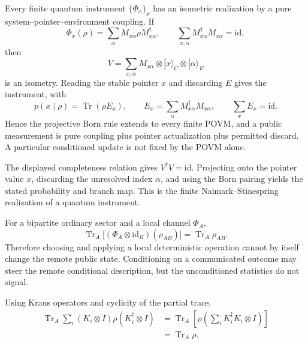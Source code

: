 \begin{theorem}
\label{thm:instrument-dilation}
Every finite quantum instrument \(\{\Phi_x\}_x\) has an isometric realization by a
pure system--pointer--environment coupling.  If
\[
 \Phi_x(\rho)=\sum_\alpha M_{x\alpha}\rho M_{x\alpha}^\dagger,
 \qquad
 \sum_{x,\alpha}M_{x\alpha}^\dagger M_{x\alpha}=\mathrm{id},
\]
then
\[
 V
 =
 \sum_{x,\alpha}
 M_{x\alpha}\otimes|x\rangle_C\otimes|\alpha\rangle_E
\]
is an isometry.  Reading the stable pointer \(x\) and discarding \(E\) gives the
instrument, with
\[
 p(x\mid\rho)
 =\operatorname{Tr}(\rho E_x),
 \qquad
 E_x=\sum_\alpha M_{x\alpha}^\dagger M_{x\alpha},
 \qquad
 \sum_xE_x=\mathrm{id}.
\]
Hence the projective Born rule extends to every finite POVM, and a public
measurement is pure coupling plus pointer actualization plus permitted discard.  A
particular conditioned update is not fixed by the POVM alone.
\end{theorem}

\begin{proofsketch}
The displayed completeness relation gives \(V^\dagger V=\mathrm{id}\).  Projecting
onto the pointer value \(x\), discarding the unresolved index \(\alpha\), and using
the Born pairing yields the stated probability and branch map.  This is the finite
Naimark--Stinespring realization of a quantum instrument.
\end{proofsketch}

\begin{theorem}
\label{thm:no-local-signalling}
For a bipartite ordinary sector and a local channel \(\Phi_A\),
\[
 \boxed{
 \operatorname{Tr}_A
 \bigl[(\Phi_A\otimes\mathrm{id}_B)(\rho_{AB})\bigr]
 =\operatorname{Tr}_A\rho_{AB}.}
\]
Therefore choosing and applying a local deterministic operation cannot by itself
change the remote public state.  Conditioning on a communicated outcome may steer
the remote conditional description, but the unconditioned statistics do not
signal.
\end{theorem}

\begin{proofsketch}
Using Kraus operators and cyclicity of the partial trace,
\[
 \begin{aligned}
 \operatorname{Tr}_A
 \sum_i(K_i\otimes I)\rho(K_i^\dagger\otimes I)
 &=
 \operatorname{Tr}_A
 \left[\rho\left(\sum_iK_i^\dagger K_i\otimes I\right)\right]\\
 &=\operatorname{Tr}_A\rho.
 \end{aligned}
\]
\end{proofsketch}

